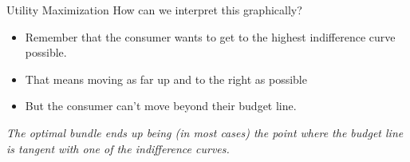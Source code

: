 \documentclass[11pt,t]{beamer}
\begin{document}
\begin{frame}{Utility Maximization}
  How can we interpret this graphically?
  \begin{itemize}
    \item Remember that the consumer wants to get to the highest indifference curve possible.

    \item That means moving as far up and to the right as possible

    \item But the consumer can't move beyond their budget line.
  \end{itemize}

  \pause\bigskip
  \emph{The optimal bundle ends up being (in most cases) the point where the budget line is tangent with one of the indifference curves.}
\end{frame}
\end{document}
